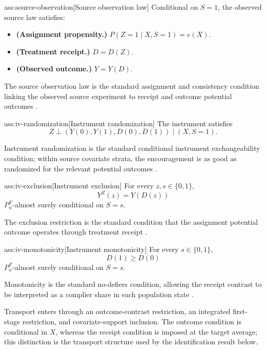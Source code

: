 \begin{assumptionv}{ass:source-observation}[Source observation law]
Conditional on \(S=1\), the observed source law satisfies:
\begin{itemize}
\item \textbf{(Assignment propensity.)} \(P(Z=1\mid X,S=1)=e(X)\).
\item \textbf{(Treatment receipt.)} \(D=D(Z)\).
\item \textbf{(Observed outcome.)} \(Y=Y(D)\).
\end{itemize}
\end{assumptionv}

The source observation law is the standard assignment and consistency condition linking the observed source experiment to receipt and outcome potential outcomes \citep{ChenHuang2025}.

\begin{assumptionv}{ass:iv-randomization}[Instrument randomization]
The instrument satisfies
\[
Z\perp (Y(0),Y(1),D(0),D(1))\mid (X,S=1).
\]
\end{assumptionv}

Instrument randomization is the standard conditional instrument exchangeability condition; within source covariate strata, the encouragement is as good as randomized for the relevant potential outcomes \citep{ChenHuang2025}.

\begin{assumptionv}{ass:iv-exclusion}[Instrument exclusion]
For every \(z,s\in\{0,1\}\),
\[
Y^Z(z)=Y(D(z))
\]
\(P_n^F\)-almost surely conditional on \(S=s\).
\end{assumptionv}

The exclusion restriction is the standard condition that the assignment potential outcome  operates through treatment receipt \citep{ChenHuang2025}.

\begin{assumptionv}{ass:iv-monotonicity}[Instrument monotonicity]
For every \(s\in\{0,1\}\),
\[
D(1)\ge D(0)
\]
\(P_n^F\)-almost surely conditional on \(S=s\).
\end{assumptionv}

Monotonicity is the standard no-defiers condition, allowing the receipt contrast to be interpreted as a complier share in each population state \citep{ChenHuang2025}.

Transport enters through an outcome-contrast restriction, an integrated first-stage restriction, and covariate-support inclusion.  The outcome condition is conditional in \(X\), whereas the receipt condition is imposed at the target average; this distinction is the transport structure used by the identification result below.

